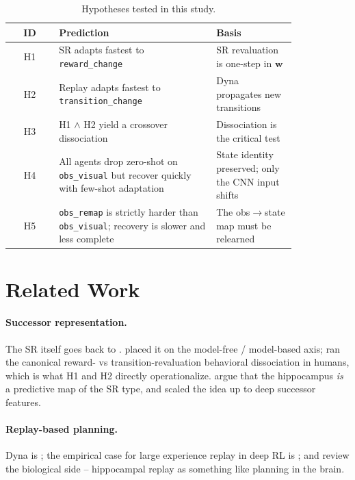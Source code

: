 \documentclass{article}
\begin{document}
\begin{table}[h]
\centering
\small
\caption{Hypotheses tested in this study.}
\label{tab:hypotheses}
\begin{tabular}{@{}c p{0.55\linewidth} p{0.28\linewidth}@{}}
\toprule
ID & Prediction & Basis \\
\midrule
H1 & SR adapts fastest to \texttt{reward\_change} & SR revaluation is one-step in $\mathbf{w}$ \citep{momennejad2017sr} \\
H2 & Replay adapts fastest to \texttt{transition\_change} & Dyna propagates new transitions \citep{sutton1990dyna} \\
H3 & H1 $\wedge$ H2 yield a crossover dissociation & Dissociation is the critical test \\
H4 & All agents drop zero-shot on \texttt{obs\_visual} but recover quickly with few-shot adaptation & State identity preserved; only the CNN input shifts \citep{sanders2020remap} \\
H5 & \texttt{obs\_remap} is strictly harder than \texttt{obs\_visual}; recovery is slower and less complete & The obs$\rightarrow$state map must be relearned \\
\bottomrule
\end{tabular}
\end{table}

\section{Related Work}
\label{sec:related}

\paragraph{Successor representation.} The SR itself goes back to \citet{dayan1993sr}. \citet{russek2017sr} placed it on the model-free / model-based axis; \citet{momennejad2017sr} ran the canonical reward- vs transition-revaluation behavioral dissociation in humans, which is what H1 and H2 directly operationalize. \citet{stachenfeld2017hippo} argue that the hippocampus \emph{is} a predictive map of the SR type, and \citet{barreto2017sf} scaled the idea up to deep successor features.

\paragraph{Replay-based planning.} Dyna is \citet{sutton1990dyna}; the empirical case for large experience replay in deep RL is \citet{mnih2015dqn}; and \citet{olafsdottir2018replay} review the biological side -- hippocampal replay as something like planning in the brain.
\end{document}
